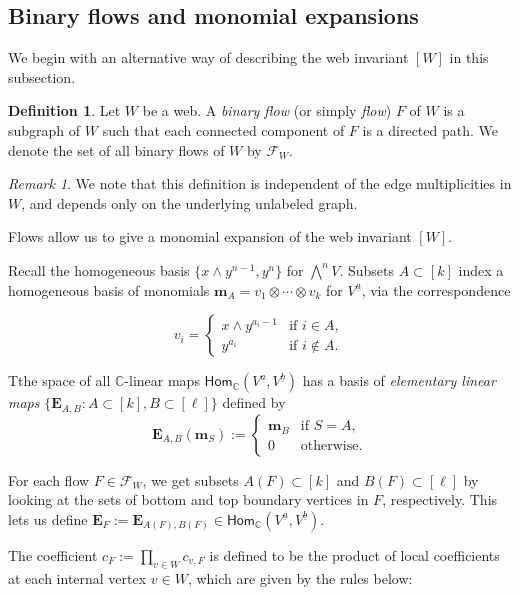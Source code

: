 \documentclass[11pt,a4paper,reqno]{amsart}
\newcommand{\C}{\mathbb{C}}
\newcommand{\F}{\mathcal{F}}
\renewcommand{\a}{\alpha}
\renewcommand{\b}{\mathfrak{b}}
\newcommand{\m}{\mathbf{m}}
\numberwithin{equation}{section}
\renewcommand{\hom}{\mathsf{Hom}}
\renewcommand{\a}{\underline a}
\renewcommand{\b}{\underline b}
\theoremstyle{definition}
\newtheorem{definition}[thm]{Definition}
\theoremstyle{remark}
\newtheorem{remark}[thm]{Remark}
\begin{document}
\subsection{Binary flows and monomial expansions} We begin with an alternative way of describing the web invariant $[W]$ in this subsection.

\begin{definition}
    Let $W$ be a web. A \emph{binary flow} (or simply \emph{flow}) $F$ of $W$ is a subgraph of $W$ such that each connected component of $F$ is a directed path. We denote the set of all binary flows of $W$ by $\F_W$.
\end{definition}

\begin{remark}
    We note that this definition is independent of the edge multiplicities in $W$, and depends only on the underlying unlabeled graph.
\end{remark}

Flows allow us to give a monomial expansion of the web invariant $[W]$.


Recall the homogeneous basis $\{x\wedge y^{n-1}, y^n\}$ for $\bigwedge^n V$. Subsets $A\subset [k]$ index a homogeneous basis of monomials $\m_A = v_1\otimes\cdots \otimes v_k$ for $V^{\a}$, via the correspondence

\[
v_i =
\begin{cases}
    x\wedge y^{a_i-1} &\text{if } i\in A,\\
    y^{a_i} &\text{if } i\notin A.
\end{cases}
\]

Tthe space of all $\C$-linear maps $\hom_\C(V^{\a}, V^{\b})$ has a basis of \emph{elementary linear maps} $\{\textbf{E}_{A, B}:A\subset [k], B\subset [\ell]\}$ defined by
\[\textbf{E}_{A,B}(\textbf{m}_S):=
\begin{cases}
    \textbf{m}_B&\text{if } S=A,\\
    0 &\text{otherwise}.
\end{cases}\]

For each flow $F\in \mathcal F_W$, we get subsets $A(F)\subset[k]$ and $B(F)\subset [\ell]$ by looking at the sets of bottom and top boundary vertices in $F$, respectively. This lets us define $\mathbf{E}_F:= \textbf{E}_{A(F), B(F)}\in\hom_\C(V^{\a}, V^{\b})$.

The coefficient $c_F:= \prod_{v\in W}c_{v, F}$ is defined to be the product of local coefficients at each internal vertex $v\in W$, which are given by the rules below:
\end{document}
